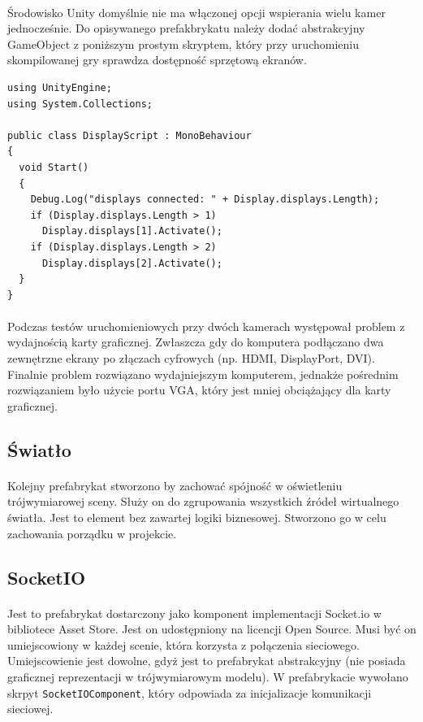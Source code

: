 \paragraph{}
Środowisko Unity domyślnie nie ma włączonej opcji wspierania wielu kamer jednocześnie. Do opisywanego prefakbrykatu należy dodać abstrakcyjny GameObject z poniższym prostym skryptem, który przy uruchomieniu skompilowanej gry sprawdza dostępność sprzętową ekranów.
\newline
\newline
\begin{lstlisting}[language=CSharp]
using UnityEngine;
using System.Collections;

public class DisplayScript : MonoBehaviour
{
  void Start()
  {
    Debug.Log("displays connected: " + Display.displays.Length);
    if (Display.displays.Length > 1)
      Display.displays[1].Activate();
    if (Display.displays.Length > 2)
      Display.displays[2].Activate();
  }
}
\end{lstlisting}

\paragraph{}
Podczas testów uruchomieniowych przy dwóch kamerach występował problem z wydajnością karty graficznej. Zwłaszcza gdy do komputera podłączano dwa zewnętrzne ekrany po złączach cyfrowych (np. HDMI, DisplayPort, DVI). Finalnie problem rozwiązano wydajniejszym komputerem, jednakże pośrednim rozwiązaniem było użycie portu VGA, który jest mniej obciążający dla karty graficznej.

\subsection{Światło}
\paragraph{}
Kolejny prefabrykat stworzono by zachować spójność w oświetleniu trójwymiarowej sceny. Służy on do zgrupowania wszystkich źródeł wirtualnego światła. Jest to element bez zawartej logiki biznesowej. Stworzono go w celu zachowania porządku w projekcie.


\subsection{SocketIO}
\paragraph{}
Jest to prefabrykat dostarczony jako komponent implementacji Socket.io w bibliotece Asset Store. Jest on udostępniony na licencji Open Source.  Musi być on umiejscowiony w każdej scenie, która korzysta z połączenia sieciowego. Umiejscowienie jest dowolne, gdyż jest to prefabrykat abstrakcyjny (nie posiada graficznej reprezentacji w trójwymiarowym modelu). W prefabrykacie wywołano skrpyt \texttt{SocketIOComponent}, który odpowiada za inicjalizacje komunikacji sieciowej.

